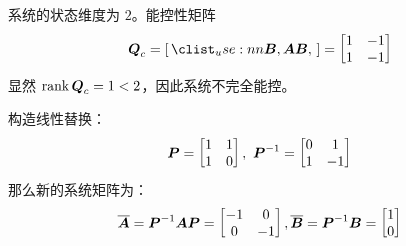 \begin{problem}
    \begin{solution}
        系统的状态维度为 $2$。能控性矩阵
        $$
        \matr{Q}_c = \rvec{\matr{B}, \matr{A} \matr{B}} = \begin{bmatrix}
            1 & -1 \\
            1 & -1 
        \end{bmatrix}
        $$
        显然 $\rank \boldsymbol{Q}_c = 1 < 2$，因此系统不完全能控。

        构造线性替换：
        $$
        \boldsymbol{P} = \begin{bmatrix}
            1 & 1 \\
            1 & 0 \\
        \end{bmatrix},\ \boldsymbol{P}^{-1} = \begin{bmatrix}
            0 & 1 \\
            1 & -1 
        \end{bmatrix}
        $$
        那么新的系统矩阵为：
        $$
        \overline{\boldsymbol{A}} = \boldsymbol{P}^{-1} \boldsymbol{A} \boldsymbol{P} = \begin{bmatrix}
            -1 & 0 \\
            0 & -1
        \end{bmatrix}, \overline{\boldsymbol{B}} = \boldsymbol{P}^{-1} \boldsymbol{B} = \begin{bmatrix}
            1 \\
            0
        \end{bmatrix}
        $$
    \end{solution}
\end{problem}

